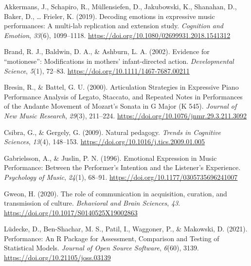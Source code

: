 \documentclass[
  man,floatsintext]{apa6}
\newlength{\cslhangindent}
\newlength{\cslentryspacingunit} %
\newenvironment{CSLReferences}[2] %
 {%
  \setlength{\parindent}{0pt}
  \ifodd #1
  \let\oldpar\par
  \def\par{\hangindent=\cslhangindent\oldpar}
  \fi
  \setlength{\parskip}{#2\cslentryspacingunit}
 }%
 {}
\begin{document}
\hypertarget{refs}{}
\begin{CSLReferences}{1}{0}
\leavevmode{}%
Akkermans, J., Schapiro, R., Müllensiefen, D., Jakubowski, K., Shanahan, D., Baker, D., \ldots{} Frieler, K. (2019). Decoding emotions in expressive music performances: {A} multi-lab replication and extension study. \emph{Cognition and Emotion}, \emph{33}(6), 1099--1118. \url{https://doi.org/10.1080/02699931.2018.1541312}

\leavevmode{}%
Brand, R. J., Baldwin, D. A., \& Ashburn, L. A. (2002). Evidence for {``motionese''}: Modifications in mothers' infant-directed action. \emph{Developmental Science}, \emph{5}(1), 72--83. \url{https://doi.org/10.1111/1467-7687.00211}

\leavevmode{}%
Bresin, R., \& Battel, G. U. (2000). Articulation {Strategies} in {Expressive Piano Performance Analysis} of {Legato}, {Staccato}, and {Repeated Notes} in {Performances} of the {Andante Movement} of {Mozart}'s {Sonata} in {G Major} ({K} 545). \emph{Journal of New Music Research}, \emph{29}(3), 211--224. \url{https://doi.org/10.1076/jnmr.29.3.211.3092}

\leavevmode{}%
Csibra, G., \& Gergely, G. (2009). Natural pedagogy. \emph{Trends in Cognitive Sciences}, \emph{13}(4), 148--153. \url{https://doi.org/10.1016/j.tics.2009.01.005}

\leavevmode{}%
Gabrielsson, A., \& Juslin, P. N. (1996). Emotional {Expression} in {Music Performance}: {Between} the {Performer}'s {Intention} and the {Listener}'s {Experience}. \emph{Psychology of Music}, \emph{24}(1), 68--91. \url{https://doi.org/10.1177/0305735696241007}

\leavevmode{}%
Gweon, H. (2020). The role of communication in acquisition, curation, and transmission of culture. \emph{Behavioral and Brain Sciences}, \emph{43}. \url{https://doi.org/10.1017/S0140525X19002863}

\leavevmode{}%
Lüdecke, D., Ben-Shachar, M. S., Patil, I., Waggoner, P., \& Makowski, D. (2021). Performance: {An R Package} for {Assessment}, {Comparison} and {Testing} of {Statistical Models}. \emph{Journal of Open Source Software}, \emph{6}(60), 3139. \url{https://doi.org/10.21105/joss.03139}


\end{CSLReferences}
\end{document}
